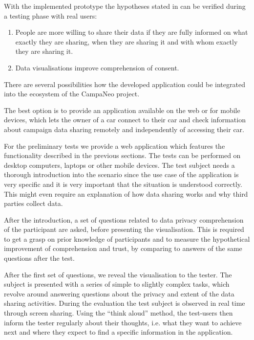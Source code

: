 \documentclass[../paper.tex]{subfiles}
\begin{document}
  With the implemented prototype the hypotheses stated in  can be verified during a
  testing phase with real users:
  \begin{enumerate}
    \item People are more willing to share their data if they are fully informed
          on what exactly they are sharing, when they are sharing it and with
          whom exactly they are sharing it.
    \item Data visualisations improve comprehension of consent.
  \end{enumerate}
  There are several possibilities how the developed application could be
  integrated into the ecosystem of the CampaNeo project.

  The best option is to provide an application available
  on the web or for mobile devices, which lets the owner of a car connect to
  their car and check information about campaign data sharing remotely and
  independently of accessing their car.

  For the preliminary tests we provide a web application which features the functionality described in the
  previous sections. The tests can be performed on desktop computers, laptops
  or other mobile devices. The test subject needs a thorough introduction
  into the scenario since the use case of the application is very specific and
  it is very important that the situation is understood correctly. This might even require an explanation of how data sharing
  works and why third parties collect data.

  After the introduction, a set of questions related to data privacy comprehension
  of the participant are asked, before presenting the visualisation. This is
  required to get a grasp on prior knowledge of participants and to measure the
  hypothetical improvement of comprehension and trust, by comparing to answers of
  the same questions after the test.

  After the first set of questions, we reveal the visualisation to the tester. The subject is presented with
  a series of simple to slightly complex tasks, which revolve around answering
  questions about the privacy and extent of the data sharing activities.
  During the evaluation the test subject is observed in real time
  through screen sharing. Using the “think aloud” method, the test-users then
  inform the tester regularly about their thoughts, i.e. what
  they want to achieve next and where they expect to find a specific information
  in the application. 
\end{document}
